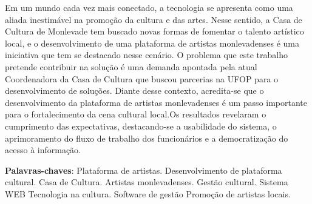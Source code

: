\setlength{\absparsep}{18pt} %

\begin{resumo}
Em um mundo cada vez mais conectado, a tecnologia se apresenta como uma aliada inestimável na promoção da cultura e das artes. Nesse sentido, a Casa de Cultura de Monlevade tem buscado novas formas de fomentar o talento artístico local, e o desenvolvimento de uma plataforma de artistas monlevadenses é uma iniciativa que tem se destacado nesse cenário. O problema que este trabalho pretende contribuir na solução é uma demanda apontada pela atual Coordenadora da Casa de Cultura que buscou parcerias na UFOP para o desenvolvimento de soluções. Diante desse contexto, acredita-se que o desenvolvimento da plataforma de artistas monlevadenses é um passo importante para o fortalecimento da cena cultural local.Os resultados revelaram o cumprimento das expectativas, destacando-se a usabilidade do sistema, o aprimoramento do fluxo de trabalho dos funcionários e a democratização do acesso à informação.


 \textbf{Palavras-chaves}:     
    Plataforma de artistas.
    Desenvolvimento de plataforma cultural.
    Casa de Cultura.
    Artistas monlevadenses.
    Gestão cultural.
    Sistema WEB
    Tecnologia na cultura.
    Software de gestão
    Promoção de artistas locais.
\end{resumo}
